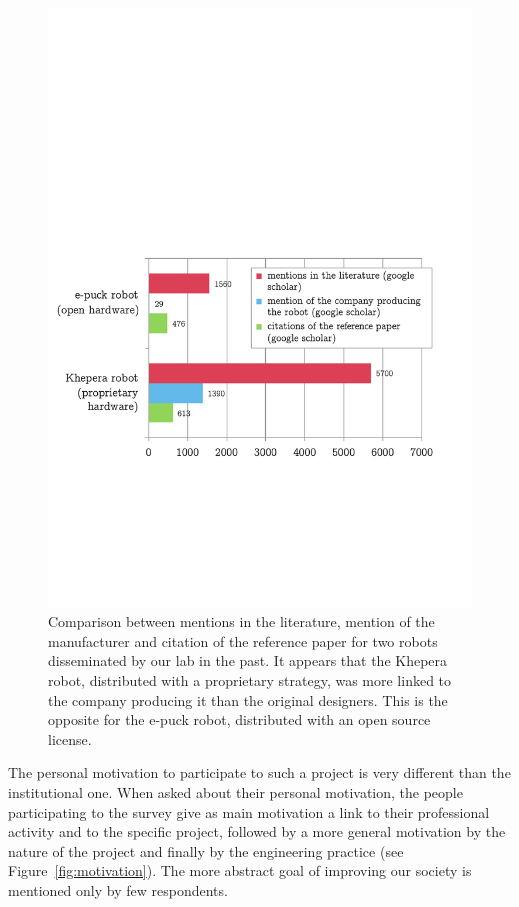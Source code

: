 \documentclass[letterpaper, 10 pt, conference]{ieeeconf}  %
\begin{document}
\begin{figure}
\centering
\includegraphics[width=\columnwidth]{figures/others_robots}
\caption{Comparison between mentions in the literature, mention of the manufacturer and citation of the reference paper for two robots disseminated by our lab in the past. It appears that the Khepera robot, distributed with a proprietary strategy, was more linked to the company producing it than the original designers. This is the opposite for the e-puck robot, distributed with an open source license.}
\label{fig:khepuck}
\end{figure}

The personal motivation to participate to such a project is very different than the institutional one. 
When asked about their personal motivation, the people participating to the survey give as main motivation a link to their professional activity and to the specific project, followed by a more general motivation by the nature of the project and finally by the engineering practice (see Figure~\ref{fig:motivation}). 
The more abstract goal of improving our society is mentioned only by few respondents.
\end{document}

